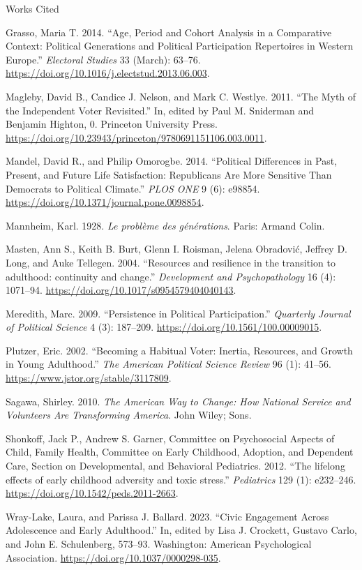 \documentclass[
  ignorenonframetext,
]{beamer}
\newlength{\cslhangindent}
\newenvironment{CSLReferences}[2] %
 {\begin{list}{}{%
  \setlength{\itemindent}{0pt}
  \setlength{\leftmargin}{0pt}
  \setlength{\parsep}{0pt}
  \ifodd #1
   \setlength{\leftmargin}{\cslhangindent}
   \setlength{\itemindent}{-1\cslhangindent}
  \fi
  \setlength{\itemsep}{#2\baselineskip}}}
 {\end{list}}
\begin{document}
\begin{frame}[allowframebreaks]{Works Cited}
\begin{CSLReferences}{1}{0}
Grasso, Maria T. 2014. {``Age, Period and Cohort Analysis in a
Comparative Context: Political Generations and Political Participation
Repertoires in Western Europe.''} \emph{Electoral Studies} 33 (March):
63--76. \url{https://doi.org/10.1016/j.electstud.2013.06.003}.

Magleby, David B., Candice J. Nelson, and Mark C. Westlye. 2011. {``The
Myth of the Independent Voter Revisited.''} In, edited by Paul M.
Sniderman and Benjamin Highton, 0. Princeton University Press.
\url{https://doi.org/10.23943/princeton/9780691151106.003.0011}.

Mandel, David R., and Philip Omorogbe. 2014. {``Political Differences in
Past, Present, and Future Life Satisfaction: Republicans Are More
Sensitive Than Democrats to Political Climate.''} \emph{PLOS ONE} 9 (6):
e98854. \url{https://doi.org/10.1371/journal.pone.0098854}.

Mannheim, Karl. 1928. \emph{Le problème des générations}. Paris: Armand
Colin.

Masten, Ann S., Keith B. Burt, Glenn I. Roisman, Jelena Obradović,
Jeffrey D. Long, and Auke Tellegen. 2004. {``Resources and resilience in
the transition to adulthood: continuity and change.''} \emph{Development
and Psychopathology} 16 (4): 1071--94.
\url{https://doi.org/10.1017/s0954579404040143}.

Meredith, Marc. 2009. {``Persistence in Political Participation.''}
\emph{Quarterly Journal of Political Science} 4 (3): 187--209.
\url{https://doi.org/10.1561/100.00009015}.

Plutzer, Eric. 2002. {``Becoming a Habitual Voter: Inertia, Resources,
and Growth in Young Adulthood.''} \emph{The American Political Science
Review} 96 (1): 41--56. \url{https://www.jstor.org/stable/3117809}.

Sagawa, Shirley. 2010. \emph{The American Way to Change: How National
Service and Volunteers Are Transforming America}. John Wiley; Sons.

Shonkoff, Jack P., Andrew S. Garner, Committee on Psychosocial Aspects
of Child, Family Health, Committee on Early Childhood, Adoption, and
Dependent Care, Section on Developmental, and Behavioral Pediatrics.
2012. {``The lifelong effects of early childhood adversity and toxic
stress.''} \emph{Pediatrics} 129 (1): e232--246.
\url{https://doi.org/10.1542/peds.2011-2663}.

Wray-Lake, Laura, and Parissa J. Ballard. 2023. {``Civic Engagement
Across Adolescence and Early Adulthood.''} In, edited by Lisa J.
Crockett, Gustavo Carlo, and John E. Schulenberg, 573--93. Washington:
American Psychological Association.
\url{https://doi.org/10.1037/0000298-035}.

\end{CSLReferences}
\end{frame}
\end{document}
